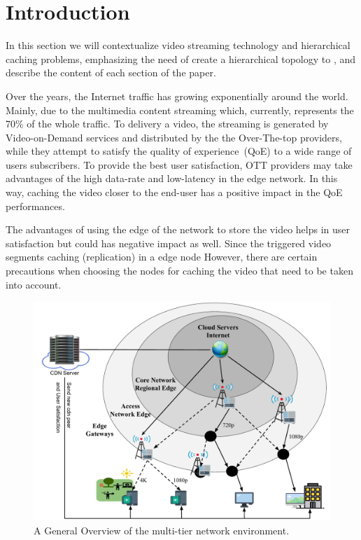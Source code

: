 \section{Introduction}
\label{sec:introduction}

{\color{blue} In this section we will contextualize video streaming technology and hierarchical caching problems, emphasizing the need of create a hierarchical topology to , and describe the content of each section of the paper.}

Over the years, the Internet traffic has growing exponentially around the world. Mainly, due to the multimedia content streaming which, currently, represents the 70\% of the whole traffic. To delivery a video, the streaming is generated by Video-on-Demand services and distributed by the the Over-The-top providers, while they attempt to satisfy the quality of experience~(QoE) to a wide range of users subscribers. To provide the best user satisfaction, OTT providers may take advantages of the high data-rate and low-latency in the edge network. In this way, caching the video closer to the end-user has a positive impact in the QoE performances.

The advantages of using the edge of the network to store the video helps in user satisfaction but could has negative impact as well. Since the triggered video segments caching (replication) in a edge node
However, there are certain precautions when choosing the nodes for caching the video that need to be taken into account. 

\begin{figure}
    \centering
    \includegraphics[width=0.9\linewidth]{images/arch-video-content.pdf}
    \caption{A General Overview of the multi-tier network environment.}
    \label{fig:impact-two-layers}
\end{figure}

